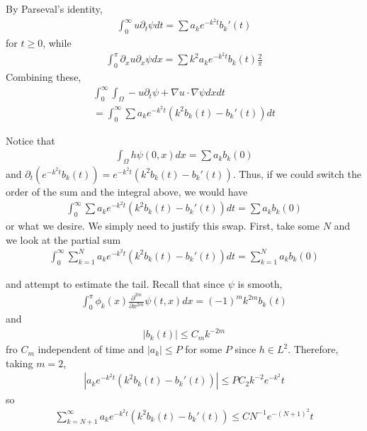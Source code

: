 \documentclass{article}
\newcommand{\pd}{\partial}
\begin{document}
	By Parseval's identity, 
	\begin{align*}
		\int_{0}^{\infty} u \pd_{t} \psi dt = \sum a_{k} e^{-k^{2}t} b_{k}'(t)
	\end{align*}
	for $t \geq 0$, while 
	\begin{align*}
		\int_{0}^{\pi} \pd_{x} u \pd_{x} \psi dx = \sum k^{2} a_{k} e^{-k^{2}t} b_{k}(t) \frac{2}{\pi}
	\end{align*}
	Combining these, 
	\begin{align*}
		\int_{0}^{\infty} \int_{\Omega} -u \pd_{t} \psi + \nabla u \cdot \nabla \psi dxdt \\
		= \int_{0}^{\infty} \sum a_{k}e^{-k^{2}t} \left(k^{2}b_{k}(t) - b_{k}'(t) \right) dt
	\end{align*}
	
	Notice that 
	\begin{align*}
		\int_{\Omega} h \psi (0,x)dx = \sum a_{k}b_{k}(0)
	\end{align*}
	and $\pd_{t}(e^{-k^{2}t}b_{k}(t)) = e^{-k^{2}t} \left(k^{2}b_{k}(t) - b_{k}'(t) \right)$. Thus, if we could switch the order of the sum and the integral above, we would have 
	\begin{align*}
		\int_{0}^{\infty} \sum a_{k}e^{-k^{2}t} \left(k^{2}b_{k}(t) - b_{k}'(t) \right) dt = \sum a_{k}b_{k}(0)
	\end{align*}
	or what we desire. We simply need to justify this swap. First, take some $N$ and we look at the partial sum 
	\begin{align*}
		\int_{0}^{\infty} \sum_{k=1}^{N}a_{k}e^{-k^{2}t} \left(k^{2}b_{k}(t) - b_{k}'(t) \right) dt = \sum_{k=1}^{N} a_{k}b_{k}(0)
	\end{align*}
	
	and attempt to estimate the tail. Recall that since $\psi$ is smooth, 
	\begin{align*}
		\int_{0}^{\pi} \phi_{k}(x) \frac{\pd^{2m}}{\pd x^{2m}} \psi(t,x) dx = (-1)^{m}k^{2m}b_{k}(t)
	\end{align*}
	and
	\begin{align*}
		|b_{k}(t)| \leq C_{m} k^{-2m}
	\end{align*}
	fro $C_{m}$ independent of time and $|a_{k}| \leq P$ for some $P$ since $h \in L^{2}$. Therefore, taking $m=2$, 
	\begin{align*}
		|a_{k}e^{-k^{2}t}(k^{2}b_{k}(t) - b_{k}'(t))| \leq PC_{2}k^{-2}e^{-k^{2}}t
	\end{align*}
	so 
	\begin{align*}
		\sum_{k=N+1}^{\infty} a_{k}e^{-k^{2}t}(k^{2}b_{k}(t) - b_{k}'(t)) \leq C N^{-1}e^{-(N+1)^{2}}t
	\end{align*}
	
\end{document}
